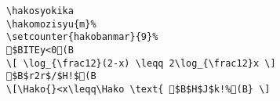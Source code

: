 \begin{verbatim}
\hakosyokika
\hakomozisyu{m}%
\setcounter{hakobanmar}{9}%
$BITEy<0(B
\[ \log_{\frac12}(2-x) \leqq 2\log_{\frac12}x \]
$B$r2r$/$H!$(B
\[\Hako{}<x\leqq\Hako \text{ $B$H$J$k!%(B} \]
\end{verbatim}
